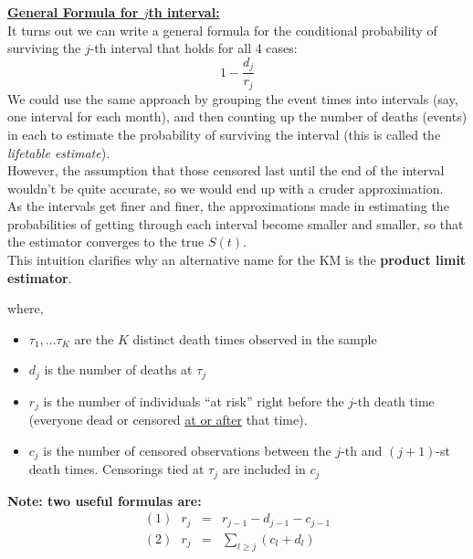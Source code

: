 \documentclass[11pt,slidesonly,semrot,portrait,palatino]{book}
\begin{document}
\underline{\bf General Formula for $j$th interval:}\\[1ex]
It turns out we can write a general formula for the
conditional probability of surviving the $j$-th interval
that holds for all 4 cases:
$$1 - \frac{d_j}{r_j}$$
We could use the same approach by grouping the event times into
intervals (say, one interval for each month), and then counting
up the number of deaths (events) in each to estimate the probability
of surviving the interval (this is called the {\em lifetable estimate}).
\\[2ex]
However, the assumption that those censored last until the end
of the interval wouldn't be quite accurate, so we would end
up with a cruder approximation.
\\[2ex]
As the intervals get finer and finer, the approximations made in
estimating the probabilities of getting through each interval
become smaller and smaller, so that the estimator
converges to the true $S(t)$.
\\[2ex]
This intuition clarifies why an alternative name for the KM is
the {\bf product limit estimator}.

\begin{center}
\end{center}
where,
\small
\begin{itemize}
\item   $\tau_1,... \tau_K$ are the $K$ distinct death times
observed in the sample
\item  $d_j$ is the number of deaths at $\tau_j$
\item  $r_j$ is the number of individuals ``at risk'' right before the $j$-th
death time (everyone dead or censored \underline{at or after} that
time).
\item   $c_j$ is the number of censored observations between the
$j$-th and $(j+1)$-st death times.  Censorings tied
at $\tau_j$ are included in $c_j$
   \end{itemize}
\normalsize
{\bf Note:  two useful formulas are:}
\begin{eqnarray*}
(1)~~~ r_j & = & r_{j-1} - d_{j-1} - c_{j-1}\\[1ex]
(2)~~~ r_j & = & \sum_{l \ge j} (c_l+d_l)
\end{eqnarray*}
\end{document}
